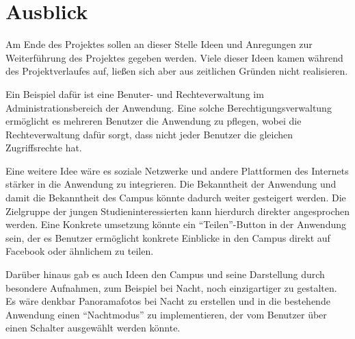 \section{Ausblick}
\label{sec:Ausblick}

Am Ende des Projektes sollen an dieser Stelle Ideen und Anregungen zur Weiterführung des Projektes gegeben werden. Viele dieser Ideen kamen während des Projektverlaufes auf, ließen sich aber aus zeitlichen Gründen nicht realisieren.

Ein Beispiel dafür ist eine Benuter- und Rechteverwaltung im Administrationsbereich der Anwendung.
Eine solche Berechtigungsverwaltung ermöglicht es mehreren Benutzer die Anwendung zu pflegen, wobei
die Rechteverwaltung dafür sorgt, dass nicht jeder Benutzer die gleichen Zugriffsrechte hat.

Eine weitere Idee wäre es soziale Netzwerke und andere Plattformen des Internets stärker in die Anwendung zu
integrieren. Die Bekanntheit der Anwendung und damit die Bekanntheit des Campus könnte dadurch weiter gesteigert
werden. Die Zielgruppe der jungen Studieninteressierten kann hierdurch direkter angesprochen werden.
Eine Konkrete umsetzung könnte ein "`Teilen"'-Button in der Anwendung sein, der es Benutzer ermöglicht
konkrete Einblicke in den Campus direkt auf Facebook oder ähnlichem zu teilen.



Darüber hinaus gab es auch Ideen den Campus und seine Darstellung durch besondere Aufnahmen, zum Beispiel bei Nacht, noch einzigartiger zu gestalten. Es wäre denkbar Panoramafotos bei Nacht zu erstellen und in die bestehende Anwendung einen "`Nachtmodus"' zu implementieren, der vom Benutzer über einen Schalter ausgewählt werden könnte.